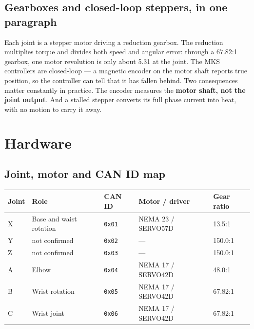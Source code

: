 \documentclass[11pt,letterpaper]{article}
\begin{document}
\subsection{Gearboxes and closed-loop steppers, in one paragraph}
Each joint is a stepper motor driving a reduction gearbox. The reduction multiplies
torque and divides both speed and angular error: through a 67.82:1 gearbox, one
motor revolution is only about 5.31\textdegree{} at the joint. The MKS controllers
are closed-loop --- a magnetic encoder on the motor shaft reports true position, so
the controller can tell that it has fallen behind. Two consequences matter
constantly in practice. The encoder measures the \textbf{motor shaft, not the joint
output}. And a stalled stepper converts its full phase current into heat, with no
motion to carry it away.

\section{Hardware}

\subsection{Joint, motor and CAN ID map}

\begin{center}
\begin{tabular}{lllll}
\toprule
\textbf{Joint} & \textbf{Role} & \textbf{CAN ID} & \textbf{Motor / driver} & \textbf{Gear ratio} \\ \midrule
X & Base and waist rotation & \texttt{0x01} & NEMA 23 / SERVO57D & 13.5:1  \\
Y & not confirmed           & \texttt{0x02} & ---                & 150.0:1 \\
Z & not confirmed           & \texttt{0x03} & ---                & 150.0:1 \\
A & Elbow                   & \texttt{0x04} & NEMA 17 / SERVO42D & 48.0:1  \\
B & Wrist rotation          & \texttt{0x05} & NEMA 17 / SERVO42D & 67.82:1 \\
C & Wrist joint             & \texttt{0x06} & NEMA 17 / SERVO42D & 67.82:1 \\
\bottomrule
\end{tabular}
\end{center}
\end{document}
